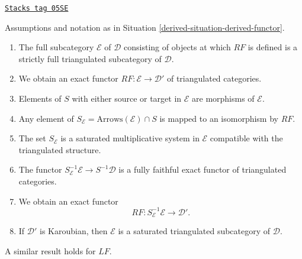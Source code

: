 \begin{proposition}
\label{derived-proposition-derived-functor}
\href{https://stacks.math.columbia.edu/tag/05SE}{\texttt{Stacks tag 05SE}}

Assumptions and notation as in Situation \ref{derived-situation-derived-functor}.
\begin{enumerate}
\item The full subcategory $\mathcal{E}$ of $\mathcal{D}$ consisting of
objects at which $RF$ is defined is a strictly full triangulated
subcategory of $\mathcal{D}$.
\item We obtain an exact functor
$RF : \mathcal{E} \longrightarrow \mathcal{D}'$
of triangulated categories.
\item Elements of $S$ with either source or target
in $\mathcal{E}$ are morphisms of $\mathcal{E}$.
\item Any element of $S_\mathcal{E} = \text{Arrows}(\mathcal{E}) \cap S$
is mapped to an isomorphism by $RF$.
\item The set $S_\mathcal{E}$ is a saturated multiplicative system in
$\mathcal{E}$ compatible with the triangulated structure.
\item The functor $S_\mathcal{E}^{-1}\mathcal{E} \to S^{-1}\mathcal{D}$
is a fully faithful exact functor of triangulated categories.
\item We obtain an exact functor
$$
RF : S_\mathcal{E}^{-1}\mathcal{E} \longrightarrow \mathcal{D}'.
$$
\item If $\mathcal{D}'$ is Karoubian, then $\mathcal{E}$ is a saturated
triangulated subcategory of $\mathcal{D}$.
\end{enumerate}
A similar result holds for $LF$.
\end{proposition}

